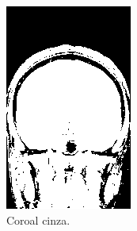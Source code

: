 \documentclass{article}
\begin{document}
\begin{figure}[H]
\begin{subfigure}[b]{0.3\textwidth}
        \includegraphics[width=\textwidth]{brain/radiologist-coronal-gray.png}
        \caption{Coroal cinza.}
    \end{subfigure}
    ~
    \begin{subfigure}[b]{0.3\textwidth}

\end{subfigure}
\end{figure}
\end{document}
